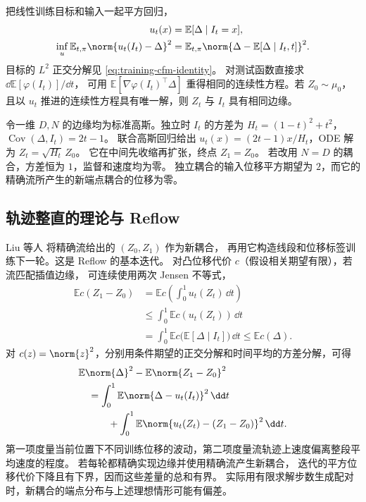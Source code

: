 把线性训练目标和输入一起平方回归，
\begin{equation}
  \begin{aligned}
  u_t(x)&=\mathbb E[\Delta\mid I_t=x],\\
  \inf_{u}\mathbb E_{t,\pi}\norm{u_t(I_t)-\Delta}^2
    &=\mathbb E_{t,\pi}\norm{\Delta-\mathbb E[\Delta\mid I_t,t]}^2 .
  \end{aligned}
  \label{eq:training-rf-conditional}
\end{equation}
目标的 \(L^2\) 正交分解见 \eqref{eq:training-cfm-identity}。
对测试函数直接求 \(\dd\mathbb E[\varphi(I_t)]/\dd t\)，
可用 \(\mathbb E[\nabla\varphi(I_t)^\top\Delta]\)
重得相同的连续性方程。若 \(Z_0\sim\mu_0\)，
且以 \(u_t\) 推进的连续性方程具有唯一解，则 \(Z_t\) 与 \(I_t\) 具有相同边缘。

\begin{example}[独立与同向高斯耦合]
\label{ex:training-rf-gaussian}
令一维 \(D,N\) 的边缘均为标准高斯。独立时 \(I_t\) 的方差为
\(H_t=(1-t)^2+t^2\)，\(\operatorname{Cov}(\Delta,I_t)=2t-1\)。
联合高斯回归给出 \(u_t(x)=(2t-1)x/H_t\)，ODE 解为 \(Z_t=\sqrt{H_t}\,Z_0\)。
它在中间先收缩再扩张，终点 \(Z_1=Z_0\)。
若改用 \(N=D\) 的耦合，方差恒为 \(1\)，监督和速度均为零。
独立耦合的输入位移平方期望为 \(2\)，而它的精确流所产生的新端点耦合的位移为零。
\end{example}

\subsection{轨迹整直的理论与 Reflow}

Liu 等人 \cite{liu2023rectified} 将精确流给出的 \((Z_0,Z_1)\) 作为新耦合，
再用它构造线段和位移标签训练下一轮。这是 Reflow 的基本迭代。
对凸位移代价 \(c\)（假设相关期望有限），若流匹配插值边缘，
可连续使用两次 Jensen 不等式，
\begin{equation}
  \begin{aligned}
  \mathbb E c(Z_1-Z_0)
    &=\mathbb E c\left(\int_0^1u_t(Z_t)\,\dd t\right)\\
    &\le \int_0^1\mathbb E c(u_t(Z_t))\,\dd t\\
    &=\int_0^1\mathbb E c\big(\mathbb E[\Delta\mid I_t]\big)\,\dd t
     \le \mathbb E c(\Delta).
  \end{aligned}
  \label{eq:training-rf-convex}
\end{equation}
对 \(c(z)=\norm{z}^2\)，分别用条件期望的正交分解和时间平均的方差分解，可得
\begin{equation}
  \begin{aligned}
   &\mathbb E\norm{\Delta}^2-\mathbb E\norm{Z_1-Z_0}^2\\
   &\quad=\int_0^1\mathbb E\norm{\Delta-u_t(I_t)}^2\,\dd t\\
   &\qquad\quad+\int_0^1\mathbb E\norm{u_t(Z_t)-(Z_1-Z_0)}^2\,\dd t .
  \end{aligned}
  \label{eq:training-rf-straightness}
\end{equation}
第一项度量当前位置下不同训练位移的波动，第二项度量流轨迹上速度偏离整段平均速度的程度。
若每轮都精确实现边缘并使用精确流产生新耦合，
迭代的平方位移代价下降且有下界，因而这些差量的总和有界。
实际用有限求解步数生成配对时，新耦合的端点分布与上述理想情形可能有偏差。

